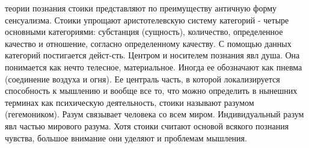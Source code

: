 \documentclass[12pt]{article}
\begin{document}
теории  познания  стоики  представляют  по  преимуществу  античную  форму  сенсуализма.  Стоики  упрощают
аристотелевскую  систему  категорий  -  четыре  основными  категориями:  субстанция  (сущность),  количество,
определенное  качество  и  отношение,  согласно  определенному  качеству.  С  помощью  данных  категорий
постигается  дейст-сть.  Центром  и  носителем  познания  явл  душа.  Она  понимается  как  нечто  телесное,
материальное. Иногда ее обозначают как пневма (соединение воздуха и огня). Ее централь часть, в которой
локализируется способность к мышлению и вообще все то, что можно определить в нынешних терминах как
психическую деятельность, стоики называют разумом (гегемоником). Разум связывает человека со всем миром.
Индивидуальный разум явл частью мирового разума. Хотя стоики считают основой всякого познания чувства,
большое внимание они уделяют и проблемам мышления. 


\newpage
\end{document}
